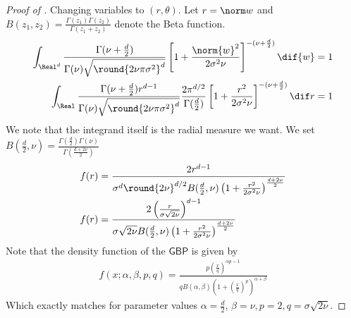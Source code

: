\documentclass{article}
\theoremstyle{plain}
\begin{document}
\begin{proof}[Proof of ]
        Changing variables to $(r, \theta)$. Let $r = \norm w$ and $B(z_1, z_2) = \frac{\Gamma(z_1)\Gamma(z_2)}{\Gamma(z_1+z_2)}$ denote the Beta function.
    \begin{align*}
\int_{\Real^d}{\frac{\Gamma(\nu+\frac{d}2)}{\Gamma(\nu) \sqrt{\round{2\nu\pi\sigma^2}^{d}}}}
     \left[1+\frac{\norm{w}^2}{2\sigma^2 \nu}\right]^{-(\nu+\frac{d}2)} \dif {w} &=1\\
 \int_{\Real}\frac{\Gamma(\nu+\frac{d}2)r^{d-1}}{\Gamma(\nu) \sqrt{\round{2\nu\pi\sigma^2}^{d}}}\frac{2 \pi^{d/2}}{\Gamma(\frac d2)}
         \left[1+\frac{r^2}{2\sigma^2 \nu}\right]^{-(\nu+\frac{d}2)} \dif r &=1 
    \end{align*}
We note that the integrand itself is the radial measure we want. We set $B \left( \frac{d}{2}, \nu \right) = \tfrac{\Gamma \left( \frac{d}{2}\right) \Gamma \left(\nu \right)}{\Gamma\left(\frac{d+2\nu}{2}\right)}$
    \begin{align*}
        f(r) &= \frac{2r^{d-1}}{\sigma^d\round{2\nu}^{d/2}B(\frac{d}{2}, \nu)\left(1+\frac{r^2}{2\sigma^2 \nu}\right)^{\frac{d+2\nu}{2}}}\\
       f(r) &= \frac{2\left(\frac{r}{\sigma\sqrt{2\nu}}\right)^{d-1}}{\sigma\sqrt{2\nu}B(\frac{d}{2}, \nu)\left(1+\frac{r^2}{2\sigma^2\nu}\right)^{\frac{d+2\nu}{2}}}
    \end{align*}
Note that the density function of the $\textsf{GBP}$ is given by  
\begin{align*}
    f(x;\alpha, \beta, p, q) = \frac{p\left(\frac{x}{q}\right)^{\alpha p-1}}{qB(\alpha, \beta)\left(1+\left(\frac{x}{q}\right)^p\right)^{\alpha + \beta}}
\end{align*}
Which exactly matches for parameter values $\alpha=\frac{d}{2}$, $\beta = \nu, p = 2, q = \sigma\sqrt{2\nu}$.
\end{proof}
\end{document}
